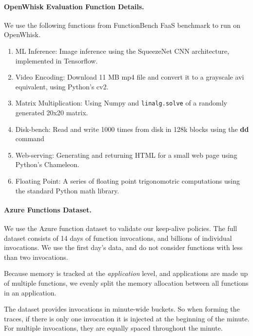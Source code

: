 \paragraph{OpenWhisk Evaluation Function Details.}




We use the following functions from FunctionBench FaaS benchmark to run on OpenWhisk. 

\begin{enumerate}
  \item ML Inference: Image inference using the SqueezeNet CNN architecture, implemented in Tensorflow.
  \item Video Encoding: Download 11 MB mp4 file and convert it to a grayscale avi equivalent, using Python's cv2. 
  \item Matrix Multiplication: Using Numpy and \texttt{linalg.solve} of a randomly generated 20x20 matrix.
  \item Disk-bench: Read and write 1000 times from disk in 128k blocks using the \textbf{dd} command
  \item Web-serving: Generating and returning HTML for a small web page using Python's Chameleon. 
  \item Floating Point: A series of floating point trigonomotric computations using the standard Python math library.
\end{enumerate}



\paragraph{Azure Functions Dataset.}

We use the Azure function dataset to validate our keep-alive policies.
The full dataset consists of 14 days of function invocations, and billions of individual invocations. 
We use the first day's data, and do not consider functions with less than two invocations. 

Because memory is tracked at the \textit{application} level, and applications are made up of multiple functions, we evenly split the memory allocation between all functions in an application.


The dataset provides invocations in minute-wide buckets.
So when forming the traces, if there is only one invocation it is injected at the beginning of the minute.
For multiple invocations, they are equally spaced throughout the minute.

